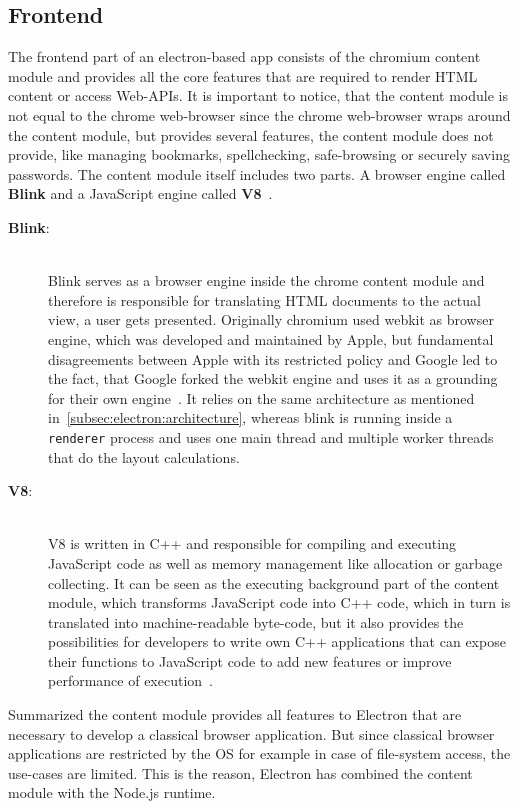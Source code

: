 \subsection{Frontend}
\label{subsec:electron:frontend}
The frontend part of an electron-based app consists of the chromium content module and provides all the core features that are required to render \ac{HTML} content
or access Web-\ac{API}s.
It is important to notice, that the content module is not equal to the chrome web-browser since the chrome web-browser wraps around the content module, but provides
several features, the content module does not provide, like managing bookmarks, spellchecking, safe-browsing or securely saving passwords.
The content module itself includes two parts.
A browser engine called \textbf{Blink} and a JavaScript engine called \textbf{V8}~\cite{electron-in-action}.
\begin{description}
    \item[\textbf{Blink}:] \hfill \\ Blink serves as a browser engine inside the chrome content module and therefore is responsible for translating \ac{HTML} documents to the actual view, a user gets presented.
    Originally chromium used webkit as browser engine, which was developed and maintained by Apple, but fundamental disagreements between Apple with its restricted policy and Google led to the fact,
    that Google forked the webkit engine and uses it as a grounding for their own engine~\cite{heiseBlink,blinkGoogle}.
    It relies on the same architecture as mentioned in~\ref{subsec:electron:architecture}, whereas blink is running inside a \texttt{renderer} process and uses one main thread
    and multiple worker threads that do the layout calculations.
    \item [\textbf{V8}:] \hfill \\ V8 is written in C++ and responsible for compiling and executing JavaScript code as well as memory management like allocation or garbage collecting.
    It can be seen as the executing background part of the content module, which transforms JavaScript code into C++ code, which in turn is translated into machine-readable byte-code,
    but it also provides the possibilities for developers to write own C++ applications that can expose their functions to JavaScript code to add new features or improve performance of execution~\cite{V8Doc}.

\end{description}
Summarized the content module provides all features to Electron that are necessary to develop a classical browser application.
But since classical browser applications are restricted by the OS for example in case of file-system access, the use-cases are limited.
This is the reason, Electron has combined the content module with the Node.js runtime.


